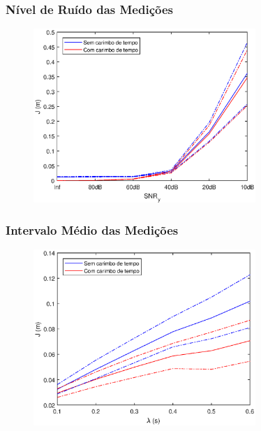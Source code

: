 \documentclass{beamer}
\renewcommand{\(}{\left(}
\renewcommand{\)}{\right)}
\renewcommand{\[}{\left[}
\renewcommand{\]}{\right]}
\begin{document}

\begin{frame}
	\frametitle{Nível de Ruído das Medições}
	
	\begin{figure}
		\centering
		\includegraphics[width=0.75\textwidth]{images/noise.eps}
	\end{figure}


\end{frame}

\begin{frame}
	\frametitle{Intervalo Médio das Medições}
	
	\begin{figure}
		\centering
		\includegraphics[width=0.75\textwidth]{images/samp.eps}
	\end{figure}

\end{frame}

\end{document}

